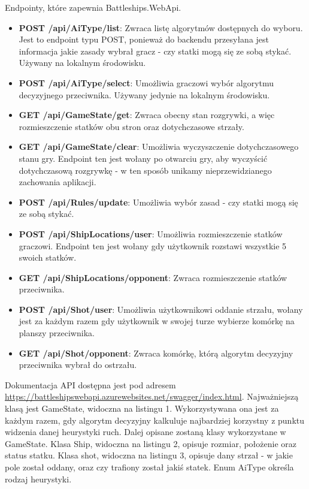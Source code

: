 Endpointy, które zapewnia Battleships.WebApi.
\begin{itemize}
    \item \textbf{POST /api/AiType/list}: Zwraca listę algorytmów dostępnych do wyboru. Jest to endpoint typu POST, ponieważ do backendu przesyłana jest informacja jakie zasady wybrał gracz - czy statki mogą się ze sobą stykać. Używany na lokalnym środowisku.
    \item \textbf{POST /api/AiType/select}: Umożliwia graczowi wybór algorytmu decyzyjnego przeciwnika. Używany jedynie na lokalnym środowisku.
    \item \textbf{GET /api/GameState/get}: Zwraca obecny stan rozgrywki, a więc rozmieszczenie statków obu stron oraz dotychczasowe strzały.
    \item \textbf{GET /api/GameState/clear}: Umożliwia wyczyszczenie dotychczasowego stanu gry. Endpoint ten jest wołany po otwarciu gry, aby wyczyścić dotychczasową rozgrywkę - w ten sposób unikamy nieprzewidzianego zachowania aplikacji.
    \item \textbf{POST /api/Rules/update}: Umożliwia wybór zasad - czy statki mogą się ze sobą stykać.
    \item \textbf{POST /api/ShipLocations/user}: Umożliwia rozmieszczenie statków graczowi. Endpoint ten jest wołany gdy użytkownik rozstawi wszystkie 5 swoich statków.
    \item \textbf{GET /api/ShipLocations/opponent}: Zwraca rozmieszczenie statków przeciwnika.
    \item \textbf{POST /api/Shot/user}: Umożliwia użytkownikowi oddanie strzału, wołany jest za każdym razem gdy użytkownik w swojej turze wybierze komórkę na planszy przeciwnika.
    \item \textbf{GET /api/Shot/opponent}: Zwraca komórkę, którą algorytm decyzyjny przeciwnika wybrał do ostrzału.
\end{itemize}

Dokumentacja API dostępna jest pod adresem \url{https://battleshipswebapi.azurewebsites.net/swagger/index.html}.
\newline \newline
Najważniejszą klasą jest GameState, widoczna na listingu 1. Wykorzystywana ona jest za każdym razem, gdy algorytm decyzyjny kalkuluje najbardziej korzystny z punktu widzenia danej heurystyki ruch. Dalej opisane zostaną klasy wykorzystane w GameState. Klasa Ship, widoczna na listingu 2, opisuje rozmiar, położenie oraz status statku. Klasa shot, widoczna na listingu 3, opisuje dany strzał - w jakie pole został oddany, oraz czy trafiony został jakiś statek. Enum AiType określa rodzaj heurystyki.

